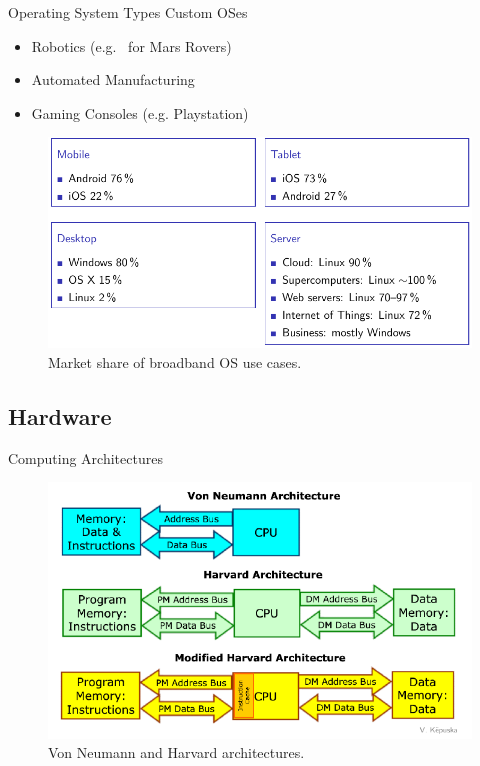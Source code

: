 \documentclass[10pt]{beamer}
\begin{document}
\begin{frame}{Operating System Types}
Custom OSes
\begin{itemize}
 \item Robotics (e.g. \ for Mars Rovers)
 \item Automated Manufacturing 
 \item Gaming Consoles (e.g. Playstation)
\end{itemize}

\begin{figure}
       \begin{center}
       \includegraphics[keepaspectratio, width=\textwidth,height=0.7\textheight-4\baselineskip]{img/104_market_share.png}
      \end{center}
      \caption{Market share of broadband OS use cases.~\autocite{mrupp}}
      \end{figure}
\end{frame}

\subsection{Hardware}
\begin{frame}{Computing Architectures}
\begin{figure}
       \begin{center}
       \includegraphics[keepaspectratio, width=\textwidth,height=0.9\textheight-4\baselineskip]{img/200_vonneumann.png}
      \end{center}
      \caption{Von Neumann and Harvard architectures.~\autocite{mrupp}}
      \end{figure}
\end{frame}
\end{document}
